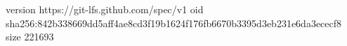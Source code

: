 version https://git-lfs.github.com/spec/v1
oid sha256:842b338669dd5aff4ae8cd3f19b1624f176fb6670b3395d3eb231e6da3ececf8
size 221693
